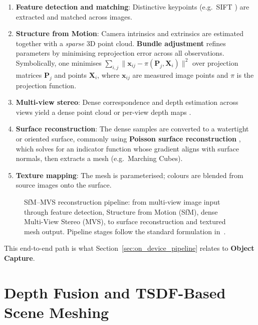 \begin{enumerate}
    \item \textbf{Feature detection and matching}: Distinctive keypoints (e.g.\ SIFT \cite{lowe2004sift}) are extracted and matched across images.

    \item \textbf{Structure from Motion}: Camera intrinsics and extrinsics are estimated together with a \emph{sparse} 3D point cloud. \textbf{Bundle adjustment} refines parameters by minimising reprojection error across all observations. Symbolically, one minimises $\sum_{i,j} \|\mathbf{x}_{ij} - \pi(\mathbf{P}_j, \mathbf{X}_i)\|^2$ over projection matrices $\mathbf{P}_j$ and points $\mathbf{X}_i$, where $\mathbf{x}_{ij}$ are measured image points and $\pi$ is the projection function.

    \item \textbf{Multi-view stereo}: Dense correspondence and depth estimation across views yield a dense point cloud or per-view depth maps \cite{furukawa2010pmvs}.

    \item \textbf{Surface reconstruction}: The dense samples are converted to a watertight or oriented surface, commonly using \textbf{Poisson surface reconstruction} \cite{kazhdan2006poisson}, which solves for an indicator function whose gradient aligns with surface normals, then extracts a mesh (e.g.\ Marching Cubes).

    \item \textbf{Texture mapping}: The mesh is parameterised; colours are blended from source images onto the surface.
\end{enumerate}
\begin{figure}[htbp]
\centering

\caption{SfM--MVS reconstruction pipeline: from multi-view image input
through feature detection, Structure from Motion (SfM), dense Multi-View
Stereo (MVS), to surface reconstruction and textured mesh output. Pipeline
stages follow the standard formulation in~\cite{luhmann2014photogrammetry,lowe2004sift,furukawa2010pmvs,kazhdan2006poisson}.}
\label{fig:ch2_photo_pipeline}
\end{figure}

This end-to-end path is what Section~\ref{sec:on_device_pipeline} relates to \textbf{Object Capture}.

\section{Depth Fusion and TSDF-Based Scene Meshing}
\label{sec:depth_fusion}

